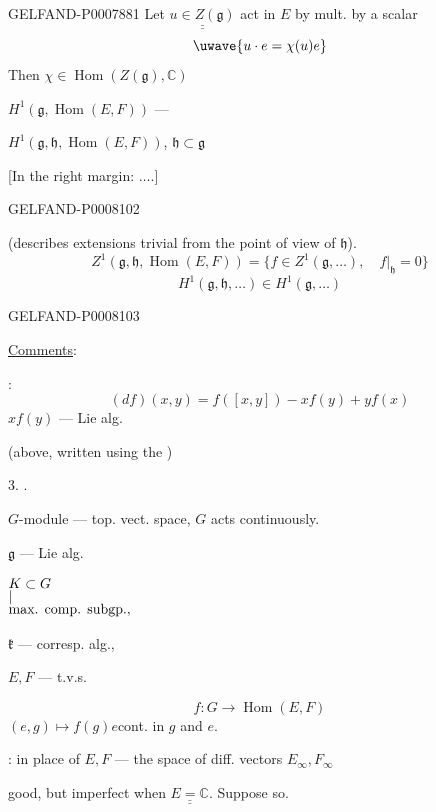\begin{GelfandAdjacentEvidence}{GELFAND-P000788}{1}
Let \(\underline{\underline{u\in Z(\mathfrak g)}}\) act in \(E\) by mult. by a scalar
\[
\text{\uwave{\(\displaystyle u\cdot e=\chi(u)e\)}}
\]
Then \(\chi\in\operatorname{Hom}(Z(\mathfrak g),\mathbb C)\)


\(H^1(\mathfrak g,\operatorname{Hom}(E,F))\) — 

\(H^1(\mathfrak g,\mathfrak h,\operatorname{Hom}(E,F))\),\qquad
\(\mathfrak h\subset\mathfrak g\)

[In the right margin: \(\ldots\).]
\end{GelfandAdjacentEvidence}
\begin{GelfandAdjacentEvidence}{GELFAND-P000810}{2}


(describes extensions trivial from the point of view of \(\mathfrak h\)).
\[
Z^1(\mathfrak g,\mathfrak h,\operatorname{Hom}(E,F))
=\{f\in Z^1(\mathfrak g,\ldots),\quad f|_{\mathfrak h}=0\}
\]
\[
H^1(\mathfrak g,\mathfrak h,\ldots)\in H^1(\mathfrak g,\ldots)
\]
\end{GelfandAdjacentEvidence}
\begin{GelfandAdjacentEvidence}{GELFAND-P000810}{3}


\uline{Comments}:

:
\[
(df)(x,y)=f([x,y])-xf(y)+yf(x)
\]
\(xf(y)\) —  Lie alg.

(above, written using the )

3. .

\(G\)-module — top. vect. space, \(G\) acts continuously.

\(\mathfrak g\) — Lie alg.

\(\begin{array}{@{}l@{}} K\subset G\\[-3pt] \vert\\[-3pt]\text{max. comp. subgp.},\end{array}\)

\(\mathfrak k\) — corresp. alg.,

\(E,F\) — t.v.s.

\quad {}
\[
f:G\longrightarrow\operatorname{Hom}(E,F)
\]
\((e,g)\longmapsto f(g)e\)\qquad cont. in \(g\) and \(e\).

: in place of \(E,F\) — the space of diff. vectors \(E_\infty,F_\infty\)

good, but imperfect when \(\underline{\underline{E=\mathbb C}}\). Suppose so.
\end{GelfandAdjacentEvidence}
